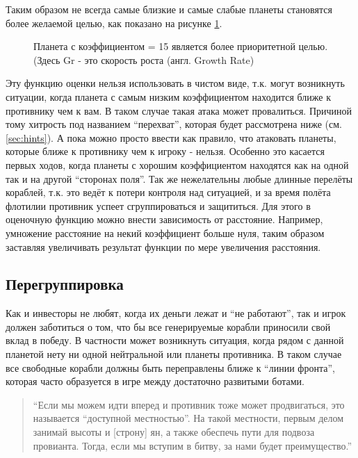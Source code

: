 \documentclass[12pt]{report}
\begin{document}
Таким образом не всегда самые близкие и самые слабые планеты становятся более желаемой целью, как показано на рисунке \ref{fig:targetingFunction}.
\begin{figure}[h]
	\centering
	
	\caption{Планета с коэффициентом = 15 является более приоритетной целью. (Здесь Gr - это скорость роста (англ. Growth Rate)}
	\label{fig:targetingFunction}
\end{figure}

Эту функцию оценки нельзя использовать в чистом виде, т.к. могут возникнуть ситуации, когда планета с самым низким коэффициентом находится ближе к противнику чем к вам. В таком случае такая атака может провалиться. Причиной тому хитрость под названием ``перехват'', которая будет рассмотрена ниже (см. \ref{sec:hints}). А пока можно просто ввести как правило, что атаковать планеты, которые ближе к противнику чем к игроку - нельзя. Особенно это касается первых ходов, когда планеты с хорошим коэффициентом находятся как на одной так и на другой ``сторонах поля''. Так же нежелательны любые длинные перелёты кораблей, т.к. это ведёт к потери контроля над ситуацией, и за время полёта флотилии противник успеет сгруппироваться и защититься. Для этого в оценочную функцию можно внести зависимость от расстояние. Например, умножение расстояние на некий коэффициент больше нуля, таким образом заставляя увеличивать результат функции по мере увеличения расстояния.

\subsection{Перегруппировка}
Как и инвесторы не любят, когда их деньги лежат и ``не работают'', так и игрок должен заботиться о том, что бы все генерируемые корабли приносили свой вклад в победу. В частности может возникнуть ситуация, когда рядом с данной планетой нету ни одной нейтральной или планеты противника. В таком случае все свободные корабли должны быть переправлены ближе к ``линии фронта'', которая часто образуется в игре между достаточно развитыми ботами.

\begin{quote}
``Если мы можем идти вперед и противник тоже может продвигаться, это называется ``доступной местностью''. На такой местности, первым делом занимай высоты и [строну] ян, а также обеспечь пути для подвоза провианта. Тогда, если мы вступим в битву, за нами будет преимущество.''\citep{tzu1971art}
\end{quote}
\end{document}
